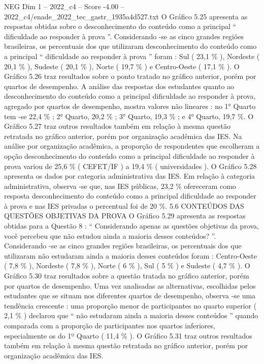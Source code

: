\begin{textsample}{NEG Dim 1 – 2022\_c4 – Score -4.00 – 2022\_c4/enade\_2022\_tec\_gastr\_1935a4d527.txt}
O Gráfico 5.25 apresenta as respostas obtidas sobre o desconhecimento do conteúdo como a principal “ dificuldade ao responder à prova ”.
Considerando -se as cinco grandes regiões brasileiras, os percentuais dos que utilizaram desconhecimento do conteúdo como a principal “ dificuldade ao responder à prova ” foram : Sul ( 23,1 \% ), Nordeste ( 20,1 \% ), Sudeste ( 20,1 \% ), Norte ( 19,7 \% ) e Centro-Oeste ( 17,1 \% ).
O Gráfico 5.26 traz resultados sobre o ponto tratado no gráfico anterior, porém por quartos de desempenho.
A análise das respostas dos estudantes quanto ao desconhecimento do conteúdo como a principal dificuldade ao responder à prova, agregado por quartos de desempenho, mostra valores não lineares : no 1{\EmojiFont °} Quarto tem -se 22,4 \% ; 2{\EmojiFont °} Quarto, 20,2 \% ; 3{\EmojiFont °} Quarto, 19,3 \% ; e 4{\EmojiFont °} Quarto, 19,7 \%.
O Gráfico 5.27 traz outros resultados também em relação à mesma questão retratada no gráfico anterior, porém por organização acadêmica das IES.
Na análise por organização acadêmica, a proporção de respondentes que escolheram a opção desconhecimento do conteúdo como a principal dificuldade ao responder à prova variou de 25,6 \% ( CEFET/IF ) a 19,4 \% ( universidades ).
O Gráfico 5.28 apresenta os dados por categoria administrativa das IES.
Em relação à categoria administrativa, observa -se que, nas IES públicas, 23,2 \% ofereceram como resposta desconhecimento do conteúdo como a principal dificuldade ao responder à prova e nas IES privadas o percentual foi de 20 \%. 5.6 CONTEÚDOS DAS QUESTÕES OBJETIVAS DA PROVA O Gráfico 5.29 apresenta as respostas obtidas para a Questão 8 : “ Considerando apenas as questões objetivas da prova, você percebeu que não estudou ainda a maioria desses conteúdos? ”.
Considerando -se as cinco grandes regiões brasileiras, os percentuais dos que utilizaram não estudaram ainda a maioria desses conteúdos foram : Centro-Oeste ( 7,8 \% ), Nordeste ( 7,8 \% ), Norte ( 6 \% ), Sul ( 5 \% ) e Sudeste ( 4,7 \% ).
O Gráfico 5.30 traz resultados sobre a questão tratada no gráfico anterior, porém por quartos de desempenho.
Uma vez analisadas as alternativas, escolhidas pelos estudantes que se situam nos diferentes quartos de desempenho, observa -se uma tendência crescente : uma proporção menor de participantes no quarto superior ( 2,1 \% ) declarou que “ não estudaram ainda a maioria desses conteúdos ” quando comparada com a proporção de participantes nos quartos inferiores, especialmente os do 1º Quarto ( 11,4 \% ).
O Gráfico 5.31 traz outros resultados também em relação à mesma questão retratada no gráfico anterior, porém por organização acadêmica das IES.

\end{textsample}
